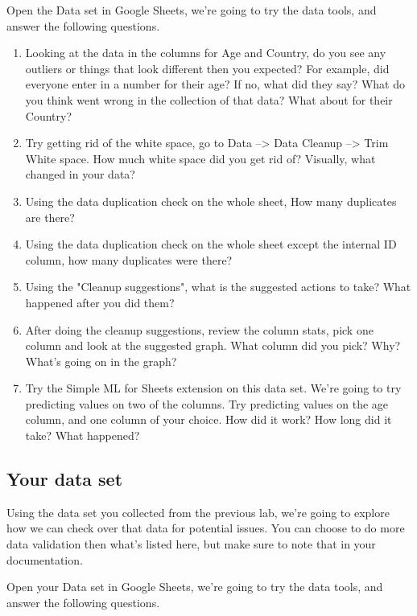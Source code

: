 \documentclass[12pt]{article}
\begin{document}
Open the Data set in Google Sheets, we're going to try the data tools, and answer the following questions. 
\begin{enumerate}
    \item Looking at the data in the columns for Age and Country, do you see any outliers or things that look different then you expected? For example, did everyone enter in a number for their age? If no, what did they say? What do you think went wrong in the collection of that data?  What about for their Country?
    \item Try getting rid of the white space, go to Data --> Data Cleanup --> Trim White space.  How much white space did you get rid of? Visually, what changed in your data?
    \item Using the data duplication check on the whole sheet, How many duplicates are there?
    \item Using the data duplication check on the whole sheet except the internal ID column, how many duplicates were there?
    \item Using the "Cleanup suggestions", what is the suggested actions to take? What happened after you did them? 
    \item After doing the cleanup suggestions, review the column stats, pick one column and look at the suggested graph.  What column did you pick? Why? What's going on in the graph? 
    \item Try the Simple ML for Sheets extension on this data set. We're going to try predicting values on two of the columns.  Try predicting values on the age column, and one column of your choice.  How did it work? How long did it take? What happened?
\end{enumerate}

 
\subsection*{Your data set}
Using the data set you collected from the previous lab, we're going to explore how we can check over that data for potential issues.  You can choose to do more data validation then what's listed here, but make sure to note that in your documentation.

Open your Data set in Google Sheets, we're going to try the data tools, and answer the following questions. 
\end{document}
